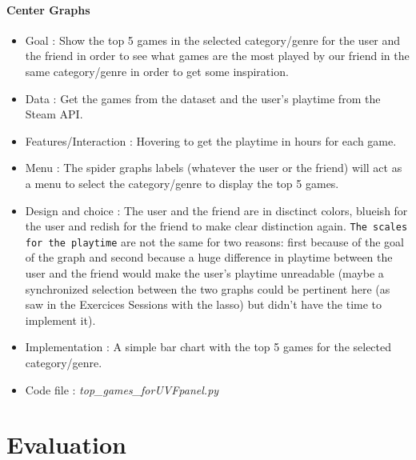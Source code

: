 \documentclass{article}
\begin{document}
	\paragraph{Center Graphs}
	\begin{itemize}
		\item Goal : Show the top 5 games in the selected category/genre for the user and the friend in order to see what games are the most played by our friend in the same category/genre in order to get some inspiration.
		\item Data : Get the games from the dataset and the user's playtime from the Steam API.
		\item Features/Interaction : Hovering to get the playtime in hours for each game.
		\item Menu : The spider graphs labels (whatever the user or the friend) will act as a menu to select the category/genre to display the top 5 games.
		\item Design and choice : The user and the friend are in disctinct colors, blueish for the user and redish for the friend to make clear distinction again. \texttt{The scales for the playtime} are not the same for two reasons: first because of the goal of the graph and second because a huge difference in playtime between the user and the friend would make the user's playtime unreadable (maybe a synchronized selection between the two graphs could be pertinent here (as saw in the Exercices Sessions with the lasso) but didn't have the time to implement it).
		\item Implementation : A simple bar chart with the top 5 games for the selected category/genre.
		\item Code file : \textit{top\_games\_forUVFpanel.py}
	\end{itemize}
	
	\section{Evaluation}
	
	
	\newpage
\end{document}
